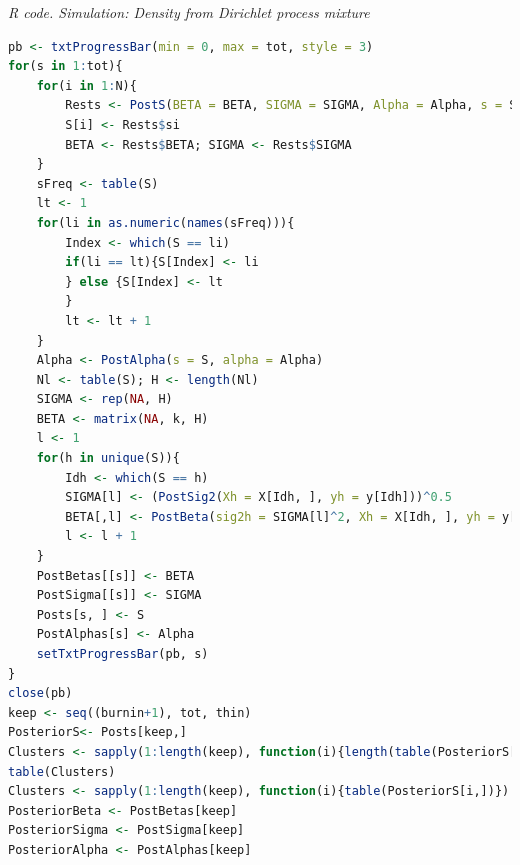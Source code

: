 \begin{enumerate}[leftmargin=*]
\begin{tcolorbox}[enhanced,width=4.67in,center upper,
	fontupper=\large\bfseries,drop shadow southwest,sharp corners]
	\textit{R code. Simulation: Density from Dirichlet process mixture}
	\begin{VF}
		\begin{lstlisting}[language=R]
pb <- txtProgressBar(min = 0, max = tot, style = 3)
for(s in 1:tot){
	for(i in 1:N){
		Rests <- PostS(BETA = BETA, SIGMA = SIGMA, Alpha = Alpha, s = S, i = i)
		S[i] <- Rests$si
		BETA <- Rests$BETA; SIGMA <- Rests$SIGMA
	}
	sFreq <- table(S)
	lt <- 1
	for(li in as.numeric(names(sFreq))){
		Index <- which(S == li)
		if(li == lt){S[Index] <- li
		} else {S[Index] <- lt
		}
		lt <- lt + 1
	}
	Alpha <- PostAlpha(s = S, alpha = Alpha)
	Nl <- table(S); H <- length(Nl)
	SIGMA <- rep(NA, H)
	BETA <- matrix(NA, k, H)
	l <- 1
	for(h in unique(S)){
		Idh <- which(S == h)
		SIGMA[l] <- (PostSig2(Xh = X[Idh, ], yh = y[Idh]))^0.5
		BETA[,l] <- PostBeta(sig2h = SIGMA[l]^2, Xh = X[Idh, ], yh = y[Idh])
		l <- l + 1
	}
	PostBetas[[s]] <- BETA
	PostSigma[[s]] <- SIGMA
	Posts[s, ] <- S
	PostAlphas[s] <- Alpha
	setTxtProgressBar(pb, s)
}
close(pb)
keep <- seq((burnin+1), tot, thin)
PosteriorS<- Posts[keep,]
Clusters <- sapply(1:length(keep), function(i){length(table(PosteriorS[i,]))})
table(Clusters)
Clusters <- sapply(1:length(keep), function(i){table(PosteriorS[i,])})
PosteriorBeta <- PostBetas[keep]
PosteriorSigma <- PostSigma[keep]
PosteriorAlpha <- PostAlphas[keep]
\end{lstlisting}
	\end{VF}
\end{tcolorbox}



\end{enumerate}
